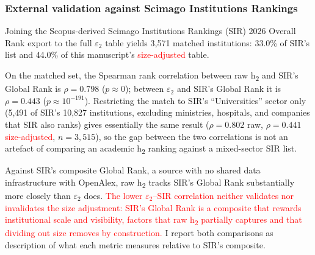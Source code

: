 
\subsubsection*{External validation against Scimago Institutions Rankings}
\label{subsubsec:scimago-validation}
Joining the Scopus-derived Scimago Institutions Rankings (SIR) 2026 Overall Rank export to the full $\varepsilon_2$ table yields 3,571 matched institutions: 33.0\% of SIR's list and 44.0\% of this manuscript's \textcolor{red}{size-adjusted} table.

On the matched set, the Spearman rank correlation between raw h\textsubscript{2} and SIR's Global Rank is $\rho = 0.798$ ($p \approx 0$); between $\varepsilon_2$ and SIR's Global Rank it is $\rho = 0.443$ ($p \approx 10^{-191}$). Restricting the match to SIR's ``Universities'' sector only (5,491 of SIR's 10,827 institutions, excluding ministries, hospitals, and companies that SIR also ranks) gives essentially the same result ($\rho = 0.802$ raw, $\rho = 0.441$ \textcolor{red}{size-adjusted}, $n = 3{,}515$), so the gap between the two correlations is not an artefact of comparing an academic h\textsubscript{2} ranking against a mixed-sector SIR list.

Against SIR's composite Global Rank, a source with no shared data infrastructure with OpenAlex, raw h\textsubscript{2} tracks SIR's Global Rank substantially more closely than $\varepsilon_2$ does. \textcolor{red}{The lower $\varepsilon_2$--SIR correlation neither validates nor invalidates the size adjustment: SIR's Global Rank is a composite that rewards institutional scale and visibility, factors that raw h\textsubscript{2} partially captures and that dividing out size removes by construction.} I report both comparisons as description of what each metric measures relative to SIR's composite.

